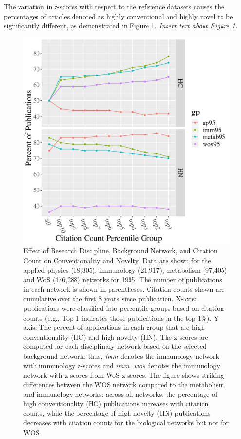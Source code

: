 \documentclass[NETN]{stjour}
\begin{document}
The variation in z-scores with respect to the reference datasets causes the percentages of articles denoted as highly conventional and highly novel to be significantly different, as demonstrated in Figure \ref{fig:Fig1}. \emph{Insert text about Figure \ref{fig:Fig1}.}

\begin{figure}
\includegraphics[width=\hsize]{pnas_fig1a}
\caption{Effect of Research Discipline,  Background Network,  and Citation Count on Conventionality and Novelty.
Data are shown for the applied physics (18,305), immunology (21,917), metabolism (97,405) and WoS (476,288) networks for 1995. The number of publications in each network is shown in parentheses. Citation counts shown are cumulative over the first 8 years since publication. 
X-axis: publications were classified into percentile groups based on citation counts (e.g., Top 1 indicates those publications in the top 1\%). Y axis: The percent of applications in each group that are high conventionality (HC) and high novelty (HN). The z-scores are computed for each disciplinary network based on the selected background network; thus, \emph{imm} denotes the immunology network with immunology z-scores and \emph{imm\_wos} denotes the immunology network with z-scores from WoS z-scores. The figure shows striking differences between the WOS network compared to the metabolism and immunology networks: across all networks, the percentage of high conventionality (HC) publications increases with citation counts, while the percentage of high novelty (HN) publications decreases with citation counts for the biological networks but not for WOS.
\label{fig:Fig1}}
\end{figure}
\end{document}
